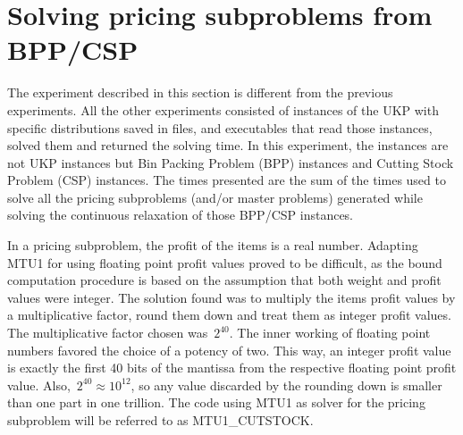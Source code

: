 
%
%

\section{Solving pricing subproblems from BPP/CSP}
\label{sec:csp_experiments}

The experiment described in this section is different from the previous experiments. %
All the other experiments consisted of instances of the UKP with specific distributions saved in files, and executables that read those instances, solved them and returned the solving time.
In this experiment, the instances are not UKP instances but Bin Packing Problem (BPP) instances and Cutting Stock Problem (CSP) instances.
The times presented are the sum of the times used to solve all the pricing subproblems (and/or master problems) generated while solving the continuous relaxation of those BPP/CSP instances.

In a pricing subproblem, the profit of the items is a real number.
Adapting MTU1 for using floating point profit values proved to be difficult, as the bound computation procedure is based on the assumption that both weight and profit values were integer.
The solution found was to multiply the items profit values by a multiplicative factor, round them down and treat them as integer profit values.
The multiplicative factor chosen was~\(2^{40}\).
The inner working of floating point numbers favored the choice of a potency of two.
This way, an integer profit value is exactly the first 40 bits of the mantissa from the respective floating point profit value.
Also,~\(2^{40} \approx 10^{12}\), so any value discarded by the rounding down is smaller than one part in one trillion.
The code using MTU1 as solver for the pricing subproblem will be referred to as MTU1\_CUTSTOCK.

